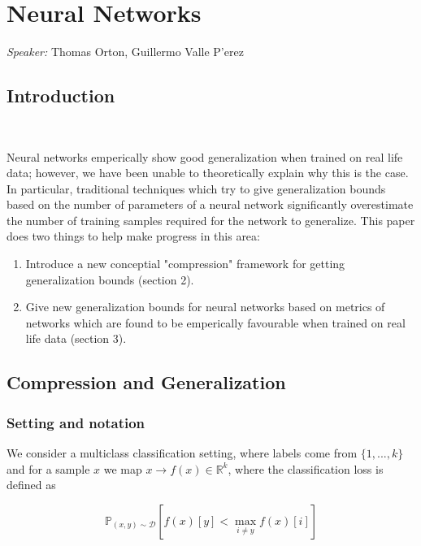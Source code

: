
\chapter{Neural Networks}

\emph{Speaker:} Thomas Orton, Guillermo Valle P'{e}rez\\


\section{Introduction}

\ 

Neural networks emperically show good generalization when trained on real life data; however, we have been unable to theoretically explain why this is the case. In particular, traditional techniques which try to give generalization bounds based on the number of parameters of a neural network significantly overestimate the number of training samples required for the network to generalize. This paper does two things to help make progress in this area: 

\begin{enumerate}

\item Introduce a new conceptial "compression" framework for getting generalization bounds (section 2).

\item Give new generalization bounds for neural networks based on metrics of networks which are found to be emperically favourable when trained on real life data (section 3). 

\end{enumerate}


\section{Compression and Generalization}

\subsection{Setting and notation}

We consider a multiclass classification setting, where labels come from $\{1,...,k\}$ and for a sample $x$ we map $x \rightarrow f(x) \in \mathbb{R}^{k}$, where the classification loss is defined as

$$\mathbb{P}_{(x,y)\sim \mathcal{D}} \left[f(x)[y] <  \max_{i\neq y} f(x)[i]\right]$$

